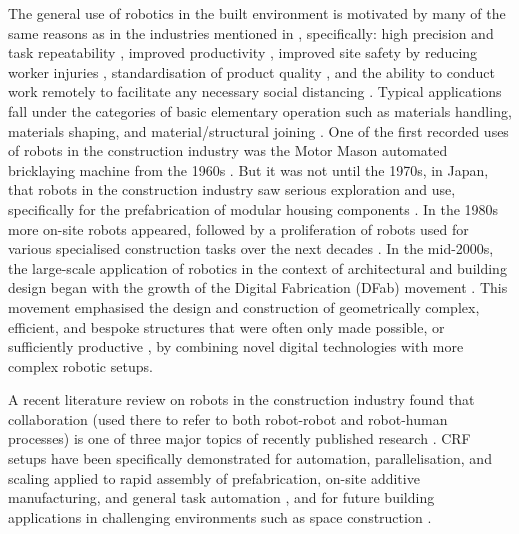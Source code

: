     The general use of robotics in the built environment is motivated by many of the same reasons as in the industries mentioned in , specifically: high precision and task repeatability \citep{wang_interactive_2021}, improved productivity \citep{xu_-site_2020}, improved site safety by reducing worker injuries \citep{chu_robot-based_2013}, standardisation of product quality \citep{dritsas_building_2019}, and the ability to conduct work remotely to facilitate any necessary social distancing \citep{wang_interactive_2021}. Typical applications fall under the categories of basic elementary operation such as materials handling, materials shaping, and material/structural joining \citep{afsari_applications_2018}. One of the first recorded uses of robots in the construction industry was the Motor Mason automated bricklaying machine from the 1960s \citep{british_pathe_mechanical_1967}. But it was not until the 1970s, in Japan, that robots in the construction industry saw serious exploration and use, specifically for the prefabrication of modular housing components \citep{bock_construction_2016}. In the 1980s more on-site robots appeared, followed by a proliferation of robots used for various specialised construction tasks over the next decades \citep{bock_construction_2007}. In the mid-2000s, the large-scale application of robotics in the context of architectural and building design began with the growth of the Digital Fabrication (DFab) movement \citep{gramazio_digital_2008, bonwetsch_informed_2006}. This movement emphasised the design and construction of geometrically complex, efficient, and bespoke structures that were often only made possible, or sufficiently productive \citep{garcia_de_soto_productivity_2018, davila_delgado_robotics_2019}, by combining novel digital technologies with more complex robotic setups. 
    
    A recent literature review on robots in the construction industry found that collaboration (used there to refer to both robot-robot and robot-human processes) is one of three major topics of recently published research \citep{xiao_recent_2022}. CRF setups have been specifically demonstrated for automation, parallelisation, and scaling applied to rapid assembly of prefabrication, on-site additive manufacturing, and general task automation \citep{petersen_review_2019, kayser_fiberbots_2018}, and for future building applications in challenging environments such as space construction \citep{xue_review_2021}.
    
